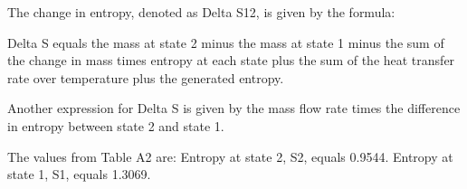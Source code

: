 The change in entropy, denoted as Delta S12, is given by the formula:

Delta S equals the mass at state 2 minus the mass at state 1 minus the sum of the change in mass times entropy at each state plus the sum of the heat transfer rate over temperature plus the generated entropy.

Another expression for Delta S is given by the mass flow rate times the difference in entropy between state 2 and state 1.

The values from Table A2 are:
Entropy at state 2, S2, equals 0.9544.
Entropy at state 1, S1, equals 1.3069.